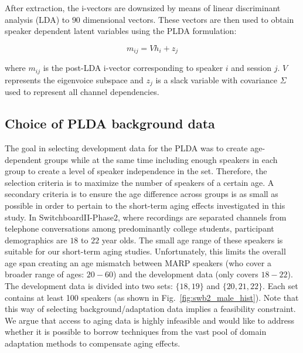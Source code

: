 \documentclass[a4paper]{article}
\begin{document}
After extraction, the i-vectors are downsized by means of linear discriminant analysis (LDA) to $90$ dimensional vectors. These vectors are then used to obtain speaker dependent latent variables using the PLDA formulation: 

\begin{equation}
\label{eq:plda}
m_{ij} = Vh_i + z_j
\end{equation}

where $m_{ij}$ is the post-LDA i-vector corresponding to speaker $i$ and session $j$. $V$ represents the eigenvoice subspace and $z_j$ is a slack variable with covariance $\Sigma$ used to represent all channel dependencies. 

\subsection{Choice of PLDA background data}
The goal in selecting development data for the PLDA was to create age-dependent groups while at the same time including enough speakers in each group to create a level of speaker independence in the set. Therefore, the selection criteria is to maximize the number of speakers of a certain age. A secondary criteria is to ensure the age difference across groups is as small as possible in order to pertain to the short-term aging effects investigated in this study. In SwitchboardII-Phase2, where recordings are separated channels from telephone conversations among predominantly college students, participant demographics are $18$ to $22$ year olds. The small age range of these speakers is suitable for our short-term aging studies. Unfortunately, this limits the overall age span creating an age mismatch between MARP speakers (who cover a broader range of ages: $20-60$) and the development data (only covers $18-22$). The development data is divided into two sets: $\{18,19\}$ and $\{20,21,22\}$. Each set contains at least 100 speakers (as shown in Fig.~\ref{fig:swb2_male_hist}). 
Note that this way of selecting background/adaptation data implies a feasibility constraint. We argue that access to aging data is highly infeasible and would like to address whether it is possible to borrow techniques from the vast pool of domain adaptation methods to compensate aging effects. 
\end{document}
